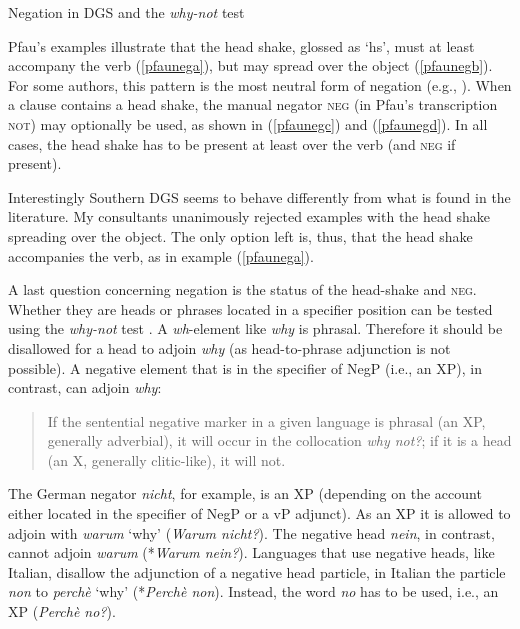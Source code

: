 \begin{digression}{Negation in DGS and the \textit{why-not} test}{}
\begin{exe}
\begin{xlist}
\end{xlist}
\end{exe} 

\noindent Pfau's examples illustrate that the head shake, glossed as `hs', must at least accompany the verb (\ref{pfaunega}), but may spread over the object (\ref{pfaunegb}). For some authors, this pattern is the most neutral form of negation (e.g., \citealt{happ2014vork}). When a clause contains a head shake, the manual negator \textsc{neg} (in Pfau's transcription \textsc{not}) may optionally be used, as shown in (\ref{pfaunegc}) and (\ref{pfaunegd}). In all cases, the head shake has to be present at least over the verb (and \textsc{neg} if present).

Interestingly Southern DGS seems to behave differently from what is found in the literature. My consultants unanimously rejected examples with the head shake spreading over the object. The only option left is, thus, that the head shake accompanies the verb, as in example (\ref{pfaunega}). 

A last question concerning negation is the status of the head-shake and \textsc{neg}. Whether they are heads or phrases located in a specifier position can be tested using the \textit{why-not} test \citep{merchant2006no, zeijlstra2015morpho}. A \textit{wh}-element like \textit{why} is phrasal. Therefore it should be disallowed for a head to adjoin \textit{why} (as head-to-phrase adjunction is not possible).  A negative element that is in the specifier of NegP (i.e., an XP), in contrast, can adjoin \textit{why}:

\begin{quote}
If the sentential negative marker in a given language is phrasal (an XP, generally adverbial), it will occur in the collocation \textit{why not?}; if it is a head (an X\textdegree , generally clitic-like), it will not. \citep[20]{merchant2006no}
\end{quote}

\noindent The German negator \textit{nicht}, for example, is an XP (depending on the account either located in the specifier of NegP or a vP adjunct). As an XP it is allowed to adjoin with \textit{warum} `why' (\textit{Warum nicht?}). The negative head \textit{nein}, in contrast, cannot adjoin \textit{warum} (*\textit{Warum nein?}). Languages that use negative heads, like Italian, disallow the adjunction of a negative head particle, in Italian the particle \textit{non} to \textit{perchè} `why' (*\textit{Perchè non}). Instead, the word \textit{no} has to be used, i.e., an XP (\textit{Perchè no?}). 


\end{digression}
